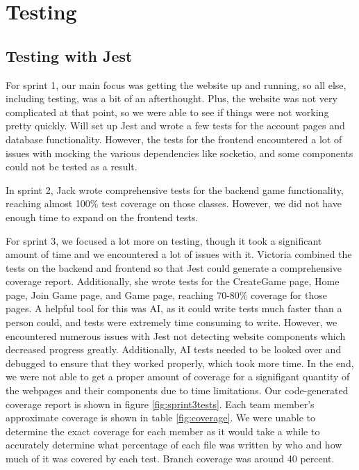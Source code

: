\section{Testing}



\subsection{Testing with Jest}

For sprint 1, our main focus was getting the website up and running, so all else, including testing, was a bit of an afterthought. Plus, the website was not very complicated at that point, so we were able to see if things were not working pretty quickly. Will set up Jest and wrote a few tests for the account pages and database functionality. However, the tests for the frontend encountered a lot of issues with mocking the various dependencies like socketio, and some components could not be tested as a result. 

In sprint 2, Jack wrote comprehensive tests for the backend game functionality, reaching almost 100\% test coverage on those classes. However, we did not have enough time to expand on the frontend tests.

For sprint 3, we focused a lot more on testing, though it took a significant amount of time and we encountered a lot of issues with it. Victoria combined the tests on the backend and frontend so that Jest could generate a comprehensive coverage report. Additionally, she wrote tests for the CreateGame page, Home page, Join Game page, and Game page, reaching 70-80\% coverage for those pages. A helpful tool for this was AI, as it could write tests much faster than a person could, and tests were extremely time consuming to write. However, we encountered numerous issues with Jest not detecting website components which decreased progress greatly. Additionally, AI tests needed to be looked over and debugged to ensure that they worked properly, which took more time. In the end, we were not able to get a proper amount of coverage for a signifigant quantity of the webpages and their components due to time limitations. Our code-generated coverage report is shown in figure \ref{fig:sprint3tests}. Each team member's approximate coverage is shown in table \ref{fig:coverage}. We were unable to determine the exact coverage for each member as it would take a while to accurately determine what percentage of each file was written by who and how much of it was covered by each test. Branch coverage was around 40 percent.

